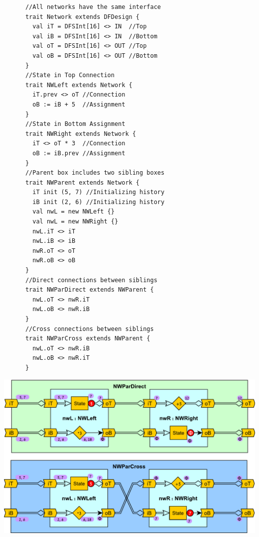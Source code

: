 \begin{table}[t!]
  \small
  \begin{minipage}[t][9cm][t]{0.343\linewidth}
    \centering
    \captionsetup{justification=centering}
    \begin{verbatim}
      //All networks have the same interface
      trait Network extends DFDesign {
        val iT = DFSInt[16] <> IN  //Top
        val iB = DFSInt[16] <> IN  //Bottom
        val oT = DFSInt[16] <> OUT //Top
        val oB = DFSInt[16] <> OUT //Bottom
      }
      //State in Top Connection
      trait NWLeft extends Network {
        iT.prev <> oT //Connection
        oB := iB + 5  //Assignment
      }
      //State in Bottom Assignment
      trait NWRight extends Network {
        iT <> oT * 3  //Connection
        oB := iB.prev //Assignment
      }
      //Parent box includes two sibling boxes
      trait NWParent extends Network {
        iT init (5, 7) //Initializing history
        iB init (2, 6) //Initializing history
        val nwL = new NWLeft {}
        val nwL = new NWRight {}
        nwL.iT <> iT
        nwL.iB <> iB
        nwR.oT <> oT
        nwR.oB <> oB
      }
      //Direct connections between siblings
      trait NWParDirect extends NWParent {
        nwL.oT <> nwR.iT
        nwL.oB <> nwR.iB
      }
      //Cross connections between siblings
      trait NWParCross extends NWParent {
        nwL.oT <> nwR.iB
        nwL.oB <> nwR.iT
      }
    \end{verbatim}
    \vfill
    \label{fig:BoxTopCode}
  \end{minipage}%
  \hfill
  \begin{minipage}[t][12cm][b]{0.64\linewidth}
    \centering
    \captionsetup{justification=centering}
    \includegraphics[width=0.9\linewidth]{graphics/connectivity.pdf}

\end{minipage}
\end{table}
